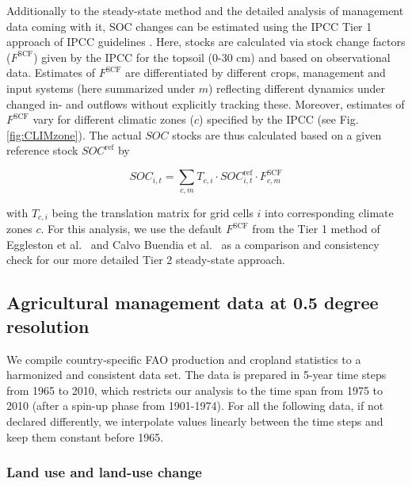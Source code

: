 \documentclass[gc, manuscript]{copernicus}
\begin{document}
Additionally to the steady-state method \citep{calvo_buendia_ipcc_2019} and the detailed analysis of management data coming with it, SOC changes can be estimated using the IPCC Tier 1 approach of IPCC guidelines \citep{eggleston_ipcc_2006, calvo_buendia_ipcc_2019}. Here, stocks are calculated via stock change factors (\(F^{\mathrm{SCF}}\)) given by the IPCC for the topsoil (0-30 cm) and based on observational data. Estimates of \(F^{\mathrm{SCF}}\) are differentiated by different crops, management and input systems (here summarized under \(m\)) reflecting different dynamics under changed in- and outflows without explicitly tracking these. Moreover, estimates of \(F^{\mathrm{SCF}}\) vary for different climatic zones (\(c\)) specified by the IPCC (see Fig. \ref{fig:CLIMzone}). The actual \(SOC\) stocks are thus calculated based on a given reference stock \(SOC^{\mathrm{ref}}\) by

\begin{equation}
SOC_{i,t} = \sum_{c,m} T_{c,i} \cdot SOC^{\mathrm{ref}}_{i,t} \cdot F^{\mathrm{SCF}}_{c,m}
\label{eq:tier1}
\end{equation}

with \(T_{c,i}\) being the translation matrix for grid cells \(i\) into corresponding climate zones \(c\). For this analysis, we use the default \(F^{\mathrm{SCF}}\) from the Tier 1 method of Eggleston et al.~\citeyearpar{eggleston_ipcc_2006} and Calvo Buendia et al.~\citep{calvo_buendia_ipcc_2019} as a comparison and consistency check for our more detailed Tier 2 steady-state approach.

\hypertarget{sec:agrimanagement}{%
\subsection{Agricultural management data at 0.5 degree resolution}\label{sec:agrimanagement}}

We compile country-specific FAO production and cropland statistics \citep{faostat_faostat_2016} to a harmonized and consistent data set. The data is prepared in 5-year time steps from 1965 to 2010, which restricts our analysis to the time span from 1975 to 2010 (after a spin-up phase from 1901-1974). For all the following data, if not declared differently, we interpolate values linearly between the time steps and keep them constant before 1965.

\hypertarget{sec:landuse}{%
\subsubsection{Land use and land-use change}\label{sec:landuse}}
\end{document}

